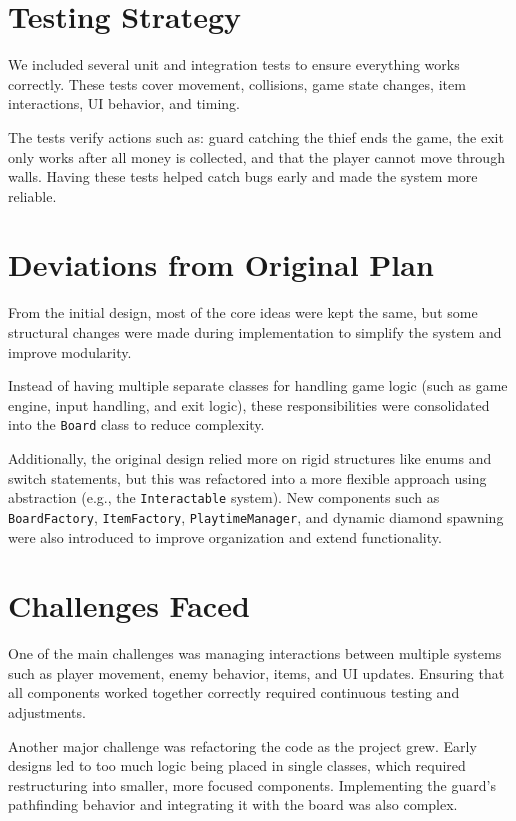 \documentclass[11pt]{article}
\begin{document}
\section{Testing Strategy}

We included several unit and integration tests to ensure everything works correctly. These tests cover movement, collisions, game state changes, item interactions, UI behavior, and timing.

The tests verify actions such as: guard catching the thief ends the game, the exit only works after all money is collected, and that the player cannot move through walls. Having these tests helped catch bugs early and made the system more reliable.

\section{Deviations from Original Plan}

From the initial design, most of the core ideas were kept the same, but some structural changes were made during implementation to simplify the system and improve modularity.

Instead of having multiple separate classes for handling game logic (such as game engine, input handling, and exit logic), these responsibilities were consolidated into the \texttt{Board} class to reduce complexity.

Additionally, the original design relied more on rigid structures like enums and switch statements, but this was refactored into a more flexible approach using abstraction (e.g., the \texttt{Interactable} system). New components such as \texttt{BoardFactory}, \texttt{ItemFactory}, \texttt{PlaytimeManager}, and dynamic diamond spawning were also introduced to improve organization and extend functionality.

\section{Challenges Faced}

One of the main challenges was managing interactions between multiple systems such as player movement, enemy behavior, items, and UI updates. Ensuring that all components worked together correctly required continuous testing and adjustments.

Another major challenge was refactoring the code as the project grew. Early designs led to too much logic being placed in single classes, which required restructuring into smaller, more focused components. Implementing the guard’s pathfinding behavior and integrating it with the board was also complex.
\end{document}
